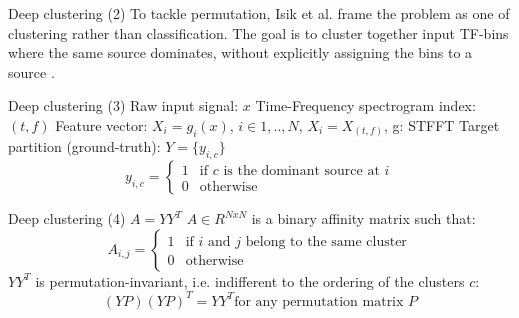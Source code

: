 \documentclass[11pt]{beamer}
\begin{document}
\begin{frame}{Deep clustering (2)}
To tackle permutation, Isik et al. frame the problem as one of clustering rather than classification. 
\linebreak
\linebreak
The goal is to cluster together input TF-bins where the same source dominates, without explicitly assigning the bins to a source \cite{1607.02173}.
\end{frame}

\begin{frame}{Deep clustering (3)}
Raw input signal: $x$ 
\linebreak
\linebreak
Time-Frequency spectrogram index: $(t,f)$
\linebreak
\linebreak
Feature vector: $X_{i} = g_{i}(x)$, $i \in {1,..,N}$, $X_{i} = X_{(t,f)}$, g: STFFT
\linebreak
\linebreak
Target partition (ground-truth): $Y={ \{y_{i,c} \}}$
\linebreak
\begin{equation}
  y_{i,c} =
  \begin{cases}
    1 & \text{if $c$ is the dominant source at $i$} \\
    0 & \text{otherwise}
  \end{cases}
\end{equation}
\end{frame}

\begin{frame}{Deep clustering (4)}
$A = YY^T$
\linebreak
$A \in R^{NxN}$ is a binary affinity matrix such that: 
\linebreak
\begin{equation}
  A_{i,j} =
  \begin{cases}
    1 & \text{if $i$ and $j$ belong to the same cluster} \\
    0 & \text{otherwise}
  \end{cases}
\end{equation}
\linebreak
\linebreak
$YY^T$ is permutation-invariant, i.e. indifferent to the ordering of the clusters $c$:
\linebreak
\begin{equation}
  (YP)(YP)^T = YY^T \text{for any permutation matrix $P$}
\end{equation}
\end{frame}
\end{document}
